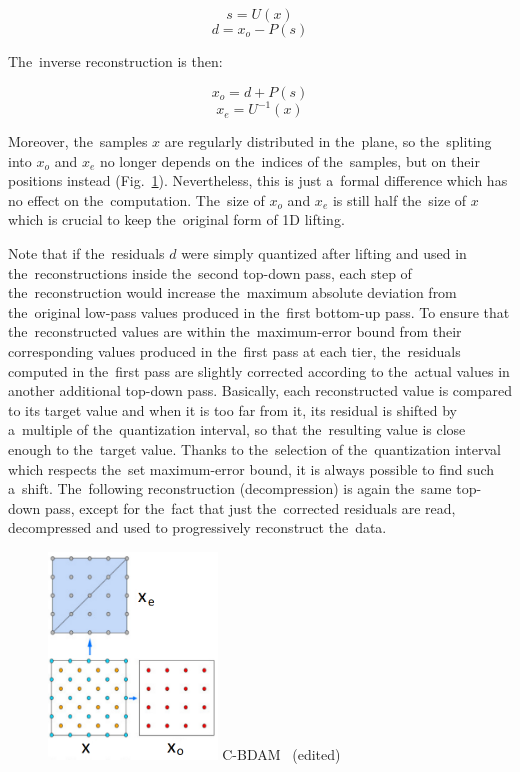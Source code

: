 $$s = U(x)$$
$$d = x_o - P(s)$$

The~inverse reconstruction is then:

$$x_o = d + P(s)$$
$$x_e = U^{-1}(x)$$

Moreover, the~samples $x$ are regularly distributed in the~plane, so the~spliting into $x_o$ and $x_e$ no longer depends on the~indices of the~samples, but on their positions instead (Fig.~\ref{fig:cbdam_lifting}). Nevertheless, this is just a~formal difference which has no effect on the~computation. The~size of $x_o$ and $x_e$ is still half the~size of $x$ which is crucial to keep the~original form of 1D lifting. 

Note that if the~residuals $d$ were simply quantized after lifting and used in the~reconstructions inside the~second top-down pass, each step of the~reconstruction would increase the~maximum absolute deviation from the~original low-pass values produced in the~first bottom-up pass. To ensure that the~reconstructed values are within the~maximum-error bound from their corresponding values produced in the~first pass at each tier, the~residuals computed in the~first pass are slightly corrected according to the~actual values in another additional top-down pass. Basically, each reconstructed value is compared to its target value and when it is too far from it, its residual is shifted by a~multiple of the~quantization interval, so that the~resulting value is close enough to the~target value. Thanks to the~selection of the~quantization interval which respects the~set maximum-error bound, it is always possible to find such a~shift. The~following reconstruction (decompression) is again the~same top-down pass, except for the~fact that just the~corrected residuals are read, decompressed and used to progressively reconstruct the~data.

\begin{figure}
	\includegraphics[width=0.4\textwidth]{figures/cbdam_lifting.png}\centering
	{C-BDAM~\cite{cbdam} (edited)}
	\label{fig:cbdam_lifting}
\end{figure}

